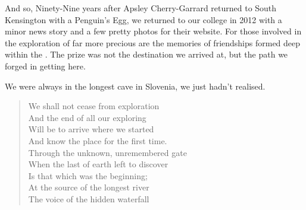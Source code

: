 And so, Ninety-Nine years after Apsley Cherry-Garrard returned to South
Kensington with a Penguin's Egg, we returned to our college in 2012 with
a minor news story and a few pretty photos for their website. For those
involved in the exploration of  far more precious are
the memories of friendships formed deep within the . The
prize was not the destination we arrived at, but the path we forged in
getting here.

We were always in the longest cave in Slovenia, we just hadn't realised.


\newpage
\begin{verse}
We shall not cease from exploration  \\
And the end of all our exploring  \\
Will be to arrive where we started  \\
And know the place for the first time. 
 \\
Through the unknown, unremembered gate  \\
When the last of earth left to discover  \\
Is that which was the beginning;  \\
At the source of the longest river  \\
The voice of the hidden waterfall \\
\end{verse}

